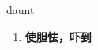 
\begin{frame}
{\huge daunt}
\begin{center}
\begin{enumerate}\Large
  \item \textbf{使胆怯，吓到}
\end{enumerate}
\end{center}
\end{frame}
